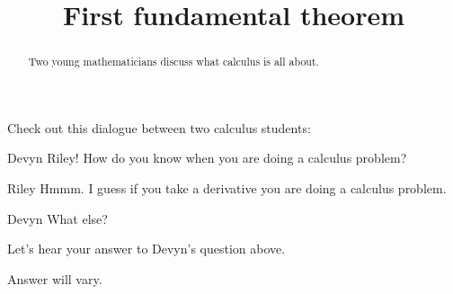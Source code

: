 \documentclass{ximera}
\title[Break-Ground:]{First fundamental theorem}
\begin{document}
\begin{abstract}
Two young mathematicians discuss what calculus is all about.
\end{abstract}
\maketitle

Check out this dialogue between two calculus students:

\begin{dialogue}
\item[Devyn] Riley! How do you know when you are doing a calculus problem?
\item[Riley] Hmmm. I guess if you take a derivative you are doing a calculus problem.
\item[Devyn] What else?
\end{dialogue}

\begin{problem}
  Let's hear your answer to Devyn's question above.
  \begin{freeResponse}
    Answer will vary.
  \end{freeResponse}
\end{problem}




\end{document}
